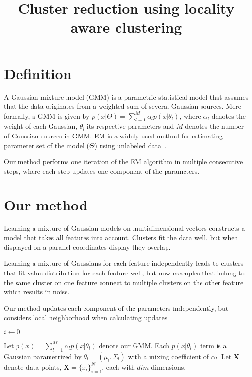 \documentclass[10pt,a4paper]{article}
\title{Cluster reduction using locality aware clustering}
\begin{document}
\maketitle
\section{Definition}
A Gaussian mixture model (GMM) is a parametric statistical model that assumes that the data originates from a weighted sum of several Gaussian sources. More formally, a GMM is given by
$p(x|\Theta) = \sum^M_{l=1}\alpha_lp(x|\theta_l)$, where $\alpha_l$ denotes the weight of each Gaussian, $\theta_l$ its respective parameters and  $M$ denotes the number of Gaussian sources in GMM. EM is a widely used method for estimating parameter set of the model ($\Theta$) using unlabeled data~\cite{dempster77}.

Our method performs one iteration of the EM algorithm in multiple consecutive steps, where each step updates one component of the parameters.

\section{Our method}
Learning a mixture of Gaussian models on multidimensional vectors constructs a model that takes all features into account. Clusters fit the data well, but when displayed on a parallel coordinates display they overlap.

Learning a mixture of Gaussians for each feature independently leads to clusters that fit value distribution for each feature well, but now examples that belong to the same cluster on one feature connect to multiple clusters on the other feature which results in noise.

Our method updates each component of the parameters independently, but considers local neighborhood when calculating updates.

\begin{algorithmic}
    \State $i\gets 0$
\EndFor
\end{algorithmic}










Let
$p(x) = \sum_{l=1}^M\alpha_lp(x|\theta_l)$ denote our GMM. Each 
$p(x|\theta_l)$ term is a Gaussian parametrized by $\theta_l = (\mu_l, \Sigma_l)$ with a mixing coefficient of $\alpha_l$. Let {\bf X} denote data points, {\bf X}$ = \{x_i\}_{i=1}^N$, each with $dim$ dimensions.
\end{document}
